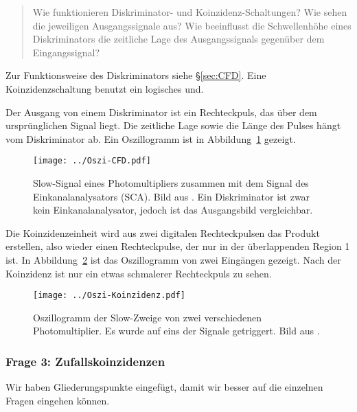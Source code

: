\documentclass[11pt, ngerman, fleqn, DIV=15, headinclude, BCOR=2cm]{scrreprt}
\begin{document}
\begin{quote}
    Wie funktionieren Diskriminator- und Koinzidenz-Schaltungen? Wie sehen die
    jeweiligen Ausgangssignale aus? Wie beeinflusst die Schwellenhöhe eines
    Diskriminators die zeitliche Lage des Ausgangssignals gegenüber dem
    Eingangssignal?
\end{quote}

Zur Funktionsweise des Diskriminators siehe §\ref{sec:CFD}. Eine
Koinzidenzschaltung benutzt ein logisches und.

Der Ausgang von einem Diskriminator ist ein Rechteckpuls, das über dem
ursprünglichen Signal liegt. Die zeitliche Lage sowie die Länge des Pulses
hängt vom Diskriminator ab. Ein Oszillogramm ist in
Abbildung~\ref{fig:oszi-cfd} gezeigt.

\begin{figure}[htbp]
    \centering
    \texttt{[image: ../Oszi-CFD.pdf]}
    \caption{%
        Slow-Signal eines Photomultipliers zusammen mit dem
        Signal des Einkanalanalysators (SCA). Bild aus
        \parencite[Abbildung~2.8]{Ueding/525}. Ein Diskriminator ist zwar kein
        Einkanalanalysator, jedoch ist das Ausgangsbild vergleichbar.
    }
    \label{fig:oszi-cfd}
\end{figure}

Die Koinzidenzeinheit wird aus zwei digitalen Rechteckpulsen das Produkt
erstellen, also wieder einen Rechteckpulse, der nur in der überlappenden Region
1 ist. In Abbildung~\ref{fig:oszi-koinzidenz} ist das Oszillogramm von zwei
Eingängen gezeigt. Nach der Koinzidenz ist nur ein etwas schmalerer
Rechteckpuls zu sehen.

\begin{figure}[htbp]
    \centering
    \texttt{[image: ../Oszi-Koinzidenz.pdf]}
    \caption{%
        Oszillogramm der Slow-Zweige von zwei verschiedenen Photomultiplier. Es
        wurde auf eins der Signale getriggert. Bild aus
        \parencite[Abbildung~2.24]{Ueding/525}.
    }
    \label{fig:oszi-koinzidenz}
\end{figure}

\subsubsection{Frage 3: Zufallskoinzidenzen}

Wir haben Gliederungspunkte eingefügt, damit wir besser auf die einzelnen
Fragen eingehen können.
\end{document}
